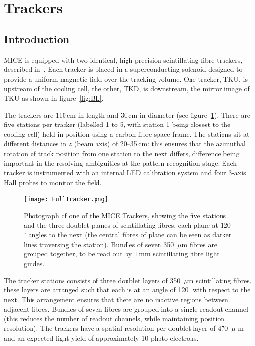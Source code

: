 \graphicspath{{06-Tracker/Figures/}}

\section{Trackers}
\label{Sect:Tracker}

\subsection{Introduction}
MICE is equipped with two identical, high precision scintillating-fibre trackers, described in~\cite{Ellis:2010bb}. Each tracker is placed in a superconducting solenoid designed to provide a uniform magnetic field over the tracking volume. One tracker, TKU, is upstream of the cooling cell, the other, TKD, is downstream, the mirror image of TKU as shown in figure~\ref{fig:BL}.

The trackers are 110\,cm in length and 30\,cm in diameter (see figure~\ref{Figure:FullTracker}). There are five stations per tracker (labelled 1 to 5, with station 1 being closest to the cooling cell) held in position using a carbon-fibre space-frame. The stations sit at different distances in $z$ (beam axis) of 20--35\,cm: this ensures that the azimuthal rotation of track position from one station to the next differs, difference being important in the resolving ambiguities at the pattern-recognition stage. Each tracker is instrumented with an internal LED calibration system and four 3-axis Hall probes to monitor the field.

\begin{figure}[ht]
\begin{center}
\texttt{[image: FullTracker.png]}
\end{center}
\caption{Photograph of one of the MICE Trackers, showing the five stations and the three doublet planes of scintillating fibres, each plane at 120$^\circ$ angles to the next (the central fibres of plane can be seen as darker lines traversing the station). Bundles of seven 350~$\mu$m fibres are grouped together, to be read out by 1\,mm scintillating fibre light guides.}
\label{Figure:FullTracker}
\end{figure}

The tracker stations consists of three doublet layers of 350~$\mu$m scintillating fibres, these layers are arranged such that each is at an angle of 120$^\circ$ with respect to the next. This arrangement ensures that there are no inactive regions between adjacent fibres. Bundles of seven fibres are grouped into a single readout channel (this reduces the number of readout channels, while maintaining position resolution). The trackers have a spatial resolution per doublet layer of 470~$\mu$ m and an expected light yield of approximately 10 photo-electrons.

